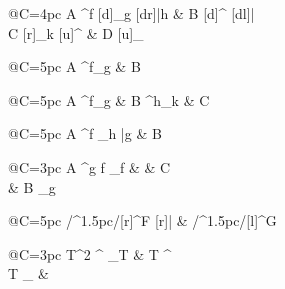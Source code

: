 \documentclass[border=10pt]{standalone}
\begin{document}


\vspace{1em}

\xymatrix@R=3pc@C=4pc{
  A \ar[r]^{f}              %
    \ar@{->}[d]_{g}         %
    [dr]|{h}        %
  & B \ar@{=>}[d]^{\alpha}  %
    \ar@{~>}[dl]|{\beta}    %
  \\
  C \ar@{-->}[r]_{k}        %
    \ar@{^{(}->}[u]^{\iota} %
  & D \ar@{->>}[u]_{\pi}    %
}

\vspace{2em}


\xymatrix@R=4pc@C=5pc{
  A \rtwocell^{f}_{g}{\alpha} & B
}

\vspace{1em}

\xymatrix@R=4pc@C=5pc{
  A \rtwocell^{f}_{g}{\alpha}
  & B \rtwocell^{h}_{k}{\beta}
  & C
}

\vspace{1em}

\xymatrix@R=3pc@C=5pc{
  A \ruppertwocell^{f}{\alpha}
    \rlowertwocell_{h}{\beta}
    \ar[r]|{g}
  & B
}

\vspace{2em}



\vspace{1em}

\xymatrix@R=3pc@C=3pc{
  A \ar[rr]^{g \circ f} \ar[dr]_{f} & & C \\
  & B \ar[ur]_{g}
}

\vspace{1em}

\xymatrix@R=4pc@C=5pc{
    \ar@/^1.5pc/[r]^{F}
    \ar@{}[r]|{\bot}
  & 
    \ar@/^1.5pc/[l]^{G}
}

\vspace{1em}

\xymatrix@R=3pc@C=3pc{
  T^2 \ar[r]^{\mu} \ar[d]_{T\mu}
  & T \ar[d]^{\mu} \\
  T \ar[r]_{\mu} & 
}
\end{document}
